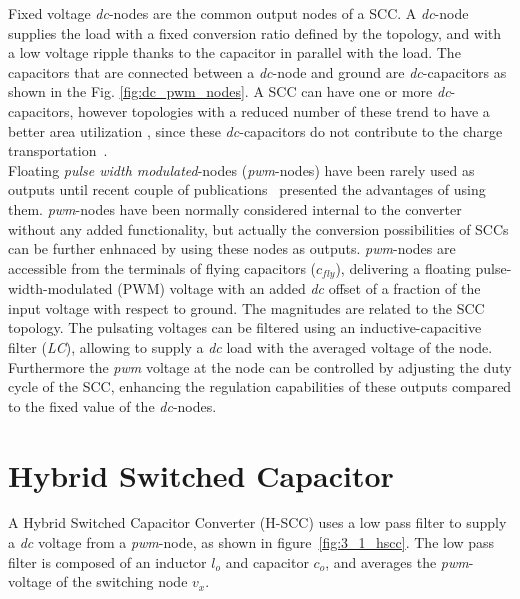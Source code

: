 Fixed voltage \emph{dc}-nodes are the common output nodes of a SCC. A \emph{dc}-node supplies the load with a fixed conversion ratio defined by the topology, and  with a low voltage ripple thanks to the capacitor in parallel with the load. The capacitors that are connected between a \emph{dc}-node and ground are  \emph{dc}-capacitors as shown in the Fig. \ref{fig:dc_pwm_nodes}. A SCC can have one or more \emph{dc}-capacitors, however topologies with a reduced number of these trend to have a better area utilization , since these \emph{dc}-capacitors do not contribute to the charge transportation~\cite{Seeman:EECS-2009-78}.\\

Floating \emph{pulse width modulated}-nodes (\emph{pwm}-nodes) have been rarely used as outputs until recent couple of publications~\cite{2012Kumar, 2012Kline} presented the advantages of using them. \emph{pwm}-nodes have been normally considered  internal to the converter without any added functionality, but actually the conversion possibilities of SCCs can be further enhnaced by using these nodes as outputs.
\emph{pwm}-nodes are accessible from the terminals of flying capacitors ($c_{fly}$), delivering a floating pulse-width-modulated (PWM) voltage with an added \emph{dc} offset of a fraction of the input voltage with respect to ground. The magnitudes are related to the SCC topology. The pulsating voltages can be filtered using an inductive-capacitive filter (\emph{LC}), allowing to supply a \emph{dc} load with the averaged voltage of the node. Furthermore the \emph{pwm} voltage at the node can be controlled by adjusting the duty
cycle of the SCC, enhancing the regulation capabilities of these outputs compared to the fixed value of the \emph{dc}-nodes.

\section{Hybrid Switched Capacitor}
A Hybrid Switched Capacitor Converter (H-SCC) uses a low pass filter to supply a \emph{dc} voltage from a \emph{pwm}-node, as shown in figure~\ref{fig:3_1_hscc}. The low pass filter is composed of an inductor $l_o$ and capacitor $c_o$, and averages the \emph{pwm}-voltage of the switching node $v_x$.

